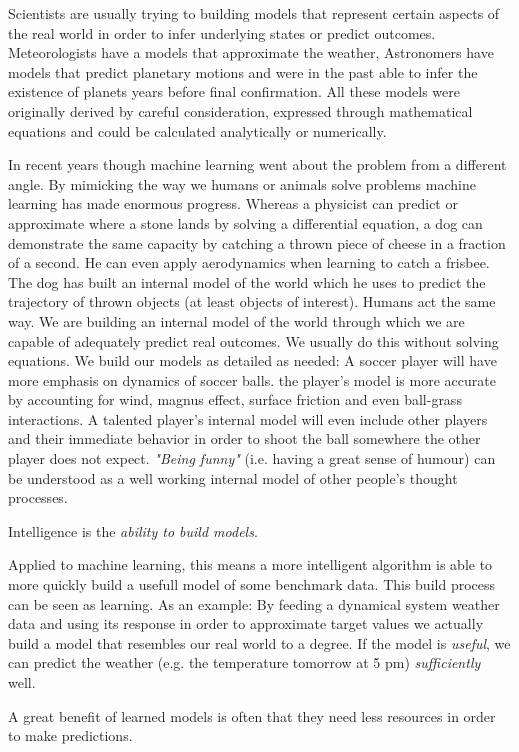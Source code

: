 	Scientists are usually trying to building models that represent certain aspects of the real world in order to infer underlying states or predict outcomes. Meteorologists have a models that approximate the weather, Astronomers have models that predict planetary motions and were in the past able to infer the existence of planets years before final confirmation. All these models were originally derived by careful consideration, expressed through mathematical equations and could be calculated analytically or numerically. 
		
	In recent years though machine learning went about the problem from a different angle. By mimicking the way we humans or animals solve problems machine learning has made enormous progress.
	Whereas a physicist can predict or approximate where a stone lands by solving a differential equation, a dog can demonstrate the same capacity by catching a thrown piece of cheese in a fraction of a second. He can even apply aerodynamics when learning to catch a frisbee. The dog has built an internal model of the world which he uses to predict the trajectory of thrown objects (at least objects of interest).
	Humans act the same way. We are building an internal model of the world through which we are capable of adequately predict real outcomes. We usually do this without solving equations. We build our models as detailed as needed: A soccer player will have more emphasis on dynamics of soccer balls. the player's model is more accurate by accounting for wind, magnus effect, surface friction and even ball-grass interactions. A talented player's internal model will even include other players and their immediate behavior in order to shoot the ball somewhere the other player does not expect.
	\emph{"Being funny"} (i.e. having a great sense of humour) can be understood as a well working internal model of other people's thought processes. 

	Intelligence is the \emph{ability to build models}.
	
	Applied to machine learning, this means a more intelligent algorithm is able to more quickly build a usefull model of some benchmark data. This build process can be seen as learning. As an example:
	By feeding a dynamical system weather data and using its response in order to approximate target values we actually build a model that resembles our real world to a degree. If the model is \emph{useful}, we can predict the weather (e.g. the temperature tomorrow at 5 pm) \emph{sufficiently} well. 
	
	A great benefit of learned models is often that they need less resources in order to make predictions.
	


